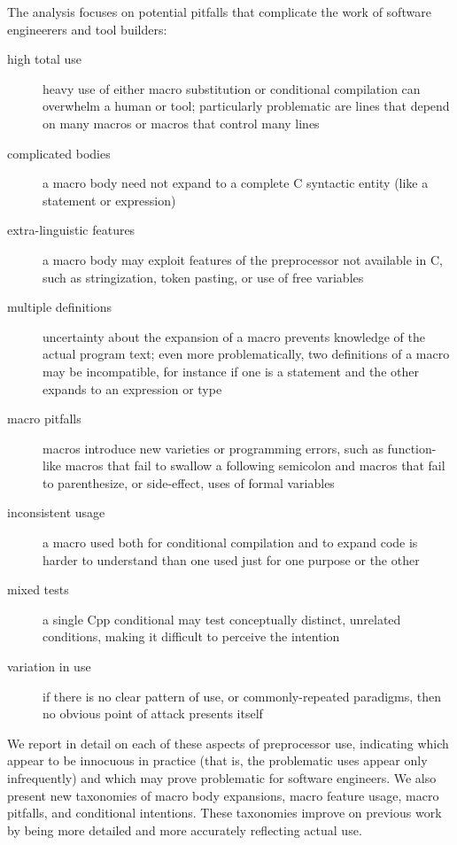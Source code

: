 \documentclass[10pt]{article}
\begin{document}
The analysis focuses on potential pitfalls that complicate the work of
software engineerers and tool builders:
\begin{description}
\item[high total use]  heavy use of either macro substitution or
  conditional compilation can overwhelm a human or tool; particularly
  problematic are lines that depend on many macros or macros that control
  many lines
\item[complicated bodies]  a macro body need not expand to a complete
  C syntactic entity (like a statement or expression)
\item[extra-linguistic features]  a macro body may exploit features of
  the preprocessor not available in C, such as stringization, token
  pasting, or use of free variables
\item[multiple definitions]  uncertainty about the expansion of a macro
  prevents knowledge of the actual program text; even more problematically,
  two definitions of a macro may be incompatible, for instance if one is a
  statement and the other expands to an expression or type
\item[macro pitfalls]  macros introduce new varieties or programming
  errors, such as function-like macros that fail to swallow a following
  semicolon and macros that fail to parenthesize, or side-effect, uses of
  formal variables
\item[inconsistent usage]  a macro used both for conditional
  compilation and to expand code is harder to understand than one used just
  for one purpose or the other
\item[mixed tests]  a single Cpp conditional may test conceptually
  distinct, unrelated conditions, making it difficult to perceive the
  intention
\item[variation in use]  if there is no clear pattern of use, or
  commonly-repeated paradigms, then no obvious point of attack presents
  itself
\end{description}
We report in detail on each of these aspects of preprocessor use,
indicating which appear to be innocuous in practice (that is, the
problematic uses appear only infrequently) and which may prove problematic
for software engineers.  We also present new taxonomies of macro body
expansions, macro feature usage, macro pitfalls, and conditional
intentions.  These taxonomies improve on previous work by being more
detailed and more accurately reflecting actual use.
\end{document}
